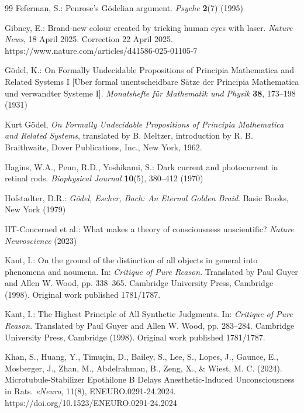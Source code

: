 \documentclass[runningheads]{llncs}
\begin{document}
\begin{thebibliography}{99}
Feferman, S.: Penrose's Gödelian argument. \textit{Psyche} \textbf{2}(7) (1995)

Gibney, E.: Brand-new colour created by tricking human eyes with laser. \textit{Nature News}, 18 April 2025. Correction 22 April 2025. https://www.nature.com/articles/d41586-025-01105-7

Gödel, K.: On Formally Undecidable Propositions of Principia Mathematica and Related Systems I [Über formal unentscheidbare Sätze der Principia Mathematica und verwandter Systeme I]. \textit{Monatshefte für Mathematik und Physik} \textbf{38}, 173--198 (1931)

Kurt Gödel, \textit{On Formally Undecidable Propositions of \emph{Principia Mathematica} and Related Systems}, 
translated by B. Meltzer, introduction by R. B. Braithwaite, Dover Publications, Inc., New York, 1962.

Hagins, W.A., Penn, R.D., Yoshikami, S.: Dark current and photocurrent in retinal rods. \textit{Biophysical Journal} \textbf{10}(5), 380--412 (1970)

Hofstadter, D.R.: \textit{Gödel, Escher, Bach: An Eternal Golden Braid}. Basic Books, New York (1979)


IIT-Concerned et al.: What makes a theory of consciousness unscientific? \textit{Nature Neuroscience} (2023)

Kant, I.: On the ground of the distinction of all objects in general into phenomena and noumena. In: \textit{Critique of Pure Reason}. Translated by Paul Guyer and Allen W. Wood, pp. 338--365. Cambridge University Press, Cambridge (1998). Original work published 1781/1787.

Kant, I.: The Highest Principle of All Synthetic Judgments. In: \textit{Critique of Pure Reason}. Translated by Paul Guyer and Allen W. Wood, pp. 283--284. Cambridge University Press, Cambridge (1998). Original work published 1781/1787.

Khan, S., Huang, Y., Timuçin, D., Bailey, S., Lee, S., Lopes, J., Gaunce, E., Mosberger, J., Zhan, M., Abdelrahman, B., Zeng, X., \& Wiest, M. C. (2024). Microtubule-Stabilizer Epothilone B Delays Anesthetic-Induced Unconsciousness in Rats. \textit{eNeuro}, 11(8), ENEURO.0291-24.2024. https://doi.org/10.1523/ENEURO.0291-24.2024


\end{thebibliography}
\end{document}

